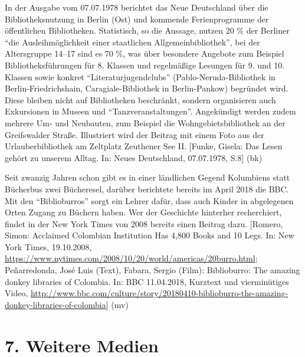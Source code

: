 \documentclass[a4paper,
fontsize=11pt,
oneside,
numbers=noperiodatend,
parskip=half-,
bibliography=totoc,
final
]{scrartcl}
\begin{document}
In der Ausgabe vom 07.07.1978 berichtet das Neue Deutschland über die
Bibliotheksnutzung in Berlin (Ost) und kommende Ferienprogramme der
öffentlichen Bibliotheken. Statistisch, so die Aussage, nutzen 20 \% der
Berliner \enquote{die Ausleihmöglichkeit einer staatlichen
Allgemeinbibliothek}, bei der Altersgruppe 14--17 sind es 70 \%, was
über besondere Angebote zum Beispiel Bibliotheksführungen für 8. Klassen
und regelmäßige Lesungen für 9. und 10. Klassen sowie konkret
\enquote{Literaturjugendclubs} (Pablo-Neruda-Bibliothek in
Berlin-Friedrichshain, Caragiale-Bibliothek in Berlin-Pankow) begründet
wird. Diese bleiben nicht auf Bibliotheken beschränkt, sondern
organisieren auch Exkursionen in Museen und
\enquote{Tanzveranstaltungen}. Angekündigt werden zudem mehrere Um- und
Neubauten, zum Beispiel die Wohngebietsbibliothek an der Greifswalder
Straße. Illustriert wird der Beitrag mit einem Foto aus der
Urlauberbibliothek am Zeltplatz Zeuthener See II. {[}Funke, Gisela: Das
Lesen gehört zu unserem Alltag. In: Neues Deutschland, 07.07.1978,
S.8{]} (bk)

Seit zwanzig Jahren schon gibt es in einer ländlichen Gegend Kolumbiens
statt Bücherbus zwei Bücheresel, darüber berichtete bereits im April
2018 die BBC. Mit den \enquote{Biblioburros} sorgt ein Lehrer dafür,
dass auch Kinder in abgelegenen Orten Zugang zu Büchern haben. Wer der
Geschichte hinterher recherchiert, findet in der New York Times von 2008
bereits einen Beitrag dazu. {[}Romero, Simon: Acclaimed Colombian
Institution Has 4,800 Books and 10 Legs. In: New York Times, 19.10.2008,
\url{https://www.nytimes.com/2008/10/20/world/americas/20burro.html};
Peñarredonda, José Luis (Text), Fabara, Sergio (Film): Biblioburro: The
amazing donkey libraries of Colombia. In: BBC 11.04.2018, Kurztext und
vierminütiges Video,
\url{http://www.bbc.com/culture/story/20180410-biblioburro-the-amazing-donkey-libraries-of-colombia}{]}
(mv)

\hypertarget{weitere-medien}{%
\section{7. Weitere Medien}\label{weitere-medien}}
\end{document}
